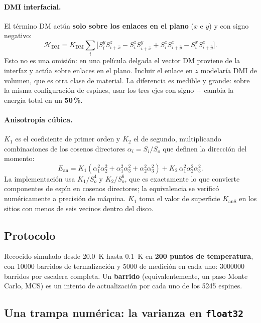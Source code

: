 \documentclass[11pt,a4paper]{article}
\begin{document}
\paragraph{DMI interfacial.} El t\'ermino DM act\'ua \textbf{solo sobre los
enlaces en el plano} ($x$ e $y$) y con signo negativo:
\begin{equation}
\mathcal{H}_{\mathrm{DM}} = K_{\mathrm{DM}}\sum_i
 \Big[ S_i^y S_{i+\hat x}^z - S_i^z S_{i+\hat x}^y
     + S_i^z S_{i+\hat y}^x - S_i^x S_{i+\hat y}^z \Big].
\end{equation}
Esto no es una omisi\'on: en una pel\'icula delgada el vector DM proviene de la
interfaz y act\'ua sobre enlaces en el plano. Incluir el enlace en $z$
modelar\'ia DMI de volumen, que es otra clase de material. La diferencia es
medible y grande: sobre la misma configuraci\'on de espines, usar los tres ejes
con signo $+$ cambia la energ\'ia total en un \textbf{50\,\%}.

\paragraph{Anisotrop\'ia c\'ubica.} $K_1$ es el coeficiente de primer orden y
$K_2$ el de segundo, multiplicando combinaciones de los cosenos directores
$\alpha_i = S_i/S_o$ que definen la direcci\'on del momento:
\begin{equation}
E_{\mathrm{an}} = K_1\left(\alpha_1^2\alpha_2^2 + \alpha_1^2\alpha_3^2
 + \alpha_2^2\alpha_3^2\right) + K_2\,\alpha_1^2\alpha_2^2\alpha_3^2 .
\end{equation}
La implementaci\'on usa $K_1/S_o^4$ y $K_2/S_o^6$, que es exactamente lo que
convierte componentes de esp\'in en cosenos directores; la equivalencia se
verific\'o num\'ericamente a precisi\'on de m\'aquina. $K_1$ toma el valor de
superficie $K_{\mathrm{anS}}$ en los sitios con menos de seis vecinos dentro del
disco.

\subsection{Protocolo}

Recocido simulado desde \SI{20.0}{\kelvin} hasta \SI{0.1}{\kelvin} en
\textbf{200 puntos de temperatura}, con \num{10000} barridos de termalizaci\'on y
\num{5000} de medici\'on en cada uno: \num{3000000} barridos por escalera
completa. Un \textbf{barrido} (equivalentemente, un paso Monte Carlo, MCS) es un
intento de actualizaci\'on por cada uno de los \num{5245} espines.

\subsection{Una trampa num\'erica: la varianza en \texttt{float32}}
\end{document}
